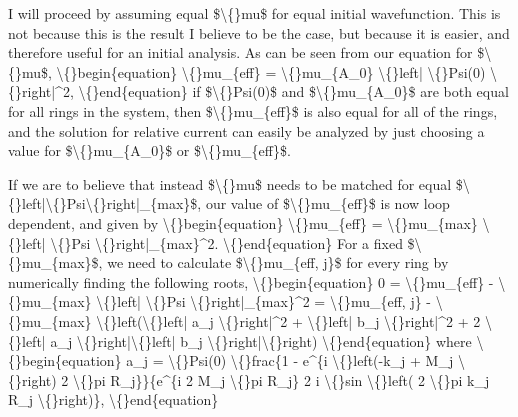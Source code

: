 \documentclass{article}
\begin{document}
I will proceed by assuming equal \$\textbackslash\{\}mu\$ for equal initial wavefunction. This is not because this is the result I believe to be the case, but because it is easier, and therefore useful for an initial analysis. As can be seen from our equation for \$\textbackslash\{\}mu\$, 
\textbackslash\{\}begin\{equation\}
\textbackslash\{\}mu\_\{eff\} = \textbackslash\{\}mu\_\{A\_0\} \textbackslash\{\}left| \textbackslash\{\}Psi(0) \textbackslash\{\}right|\textasciicircum{}2,
\textbackslash\{\}end\{equation\}
if \$\textbackslash\{\}Psi(0)\$ and \$\textbackslash\{\}mu\_\{A\_0\}\$ are both equal for all rings in the system, then \$\textbackslash\{\}mu\_\{eff\}\$ is also equal for all of the rings, and the solution for relative current can easily be analyzed by just choosing a value for \$\textbackslash\{\}mu\_\{A\_0\}\$ or \$\textbackslash\{\}mu\_\{eff\}\$.

If we are to believe that instead \$\textbackslash\{\}mu\$ needs to be matched for equal \$\textbackslash\{\}left|\textbackslash\{\}Psi\textbackslash\{\}right|\_\{max\}\$, our value of \$\textbackslash\{\}mu\_\{eff\}\$ is now loop dependent, and given by
\textbackslash\{\}begin\{equation\}
\textbackslash\{\}mu\_\{eff\} = \textbackslash\{\}mu\_\{max\} \textbackslash\{\}left| \textbackslash\{\}Psi \textbackslash\{\}right|\_\{max\}\textasciicircum{}2.
\textbackslash\{\}end\{equation\}
For a fixed \$\textbackslash\{\}mu\_\{max\}\$, we need to calculate \$\textbackslash\{\}mu\_\{eff, j\}\$ for every ring by numerically finding the following roots, 
\textbackslash\{\}begin\{equation\}
0 = \textbackslash\{\}mu\_\{eff\} - \textbackslash\{\}mu\_\{max\} \textbackslash\{\}left| \textbackslash\{\}Psi \textbackslash\{\}right|\_\{max\}\textasciicircum{}2 = \textbackslash\{\}mu\_\{eff, j\} - \textbackslash\{\}mu\_\{max\} \textbackslash\{\}left(\textbackslash\{\}left| a\_j \textbackslash\{\}right|\textasciicircum{}2 + \textbackslash\{\}left| b\_j \textbackslash\{\}right|\textasciicircum{}2 + 2 \textbackslash\{\}left| a\_j \textbackslash\{\}right|\textbackslash\{\}left| b\_j \textbackslash\{\}right|\textbackslash\{\}right)
\textbackslash\{\}end\{equation\}
where
\textbackslash\{\}begin\{equation\}
a\_j = \textbackslash\{\}Psi(0) \textbackslash\{\}frac\{1 - e\textasciicircum{}\{i \textbackslash\{\}left(-k\_j + M\_j \textbackslash\{\}right) 2 \textbackslash\{\}pi R\_j\}\}\{e\textasciicircum{}\{i 2 M\_j \textbackslash\{\}pi R\_j\} 2 i \textbackslash\{\}sin \textbackslash\{\}left( 2 \textbackslash\{\}pi k\_j R\_j \textbackslash\{\}right)\},
\textbackslash\{\}end\{equation\} 
\end{document}
